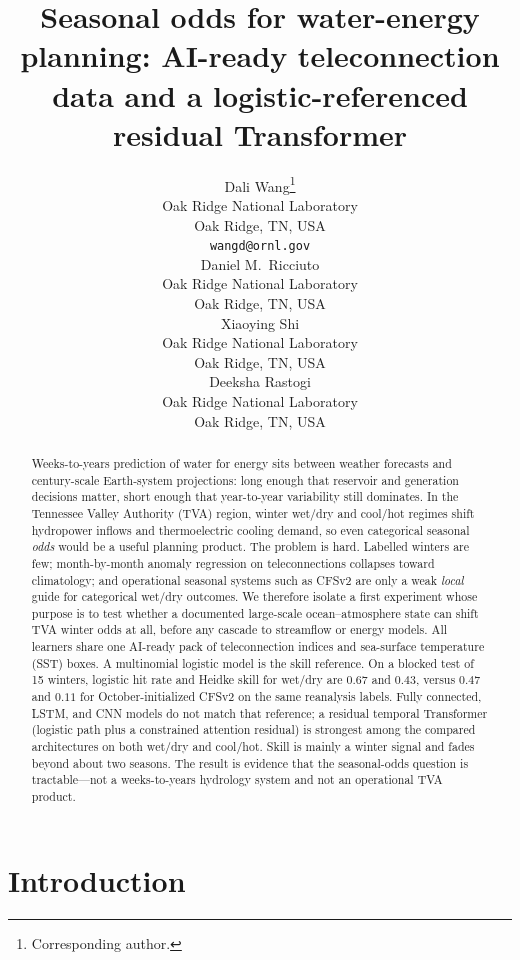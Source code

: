 \documentclass{article}
\title{Seasonal odds for water-energy planning: AI-ready teleconnection data and a logistic-referenced residual Transformer}
\author{%
  Dali Wang\thanks{Corresponding author.} \\
  Oak Ridge National Laboratory \\
  Oak Ridge, TN, USA \\
  \texttt{wangd@ornl.gov} \\
  \And
  Daniel M.~Ricciuto \\
  Oak Ridge National Laboratory \\
  Oak Ridge, TN, USA \\
  \AND
  Xiaoying Shi \\
  Oak Ridge National Laboratory \\
  Oak Ridge, TN, USA \\
  \And
  Deeksha Rastogi \\
  Oak Ridge National Laboratory \\
  Oak Ridge, TN, USA \\
}
\begin{document}
\maketitle

\begin{abstract}
Weeks-to-years prediction of water for energy sits between weather forecasts and century-scale Earth-system projections: long enough that reservoir and generation decisions matter, short enough that year-to-year variability still dominates. In the Tennessee Valley Authority (TVA) region, winter wet/dry and cool/hot regimes shift hydropower inflows and thermoelectric cooling demand, so even categorical seasonal \emph{odds} would be a useful planning product. The problem is hard. Labelled winters are few; month-by-month anomaly regression on teleconnections collapses toward climatology; and operational seasonal systems such as CFSv2 are only a weak \emph{local} guide for categorical wet/dry outcomes. We therefore isolate a first experiment whose purpose is to test whether a documented large-scale ocean--atmosphere state can shift TVA winter odds at all, before any cascade to streamflow or energy models. All learners share one AI-ready pack of teleconnection indices and sea-surface temperature (SST) boxes. A multinomial logistic model is the skill reference. On a blocked test of 15 winters, logistic hit rate and Heidke skill for wet/dry are \(0.67\) and \(0.43\), versus \(0.47\) and \(0.11\) for October-initialized CFSv2 on the same reanalysis labels. Fully connected, LSTM, and CNN models do not match that reference; a residual temporal Transformer (logistic path plus a constrained attention residual) is strongest among the compared architectures on both wet/dry and cool/hot. Skill is mainly a winter signal and fades beyond about two seasons. The result is evidence that the seasonal-odds question is tractable---not a weeks-to-years hydrology system and not an operational TVA product.
\end{abstract}

\section{Introduction}
\end{document}
